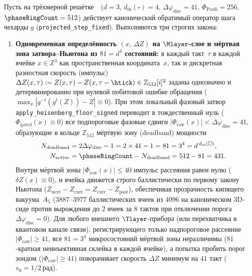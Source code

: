 \begin{theorem}[Строго локальный пороговый затвор--Ньютона $81 = d^4$, локальное зеркало Паули $Z_{\mathrm{next}} = -Z_{\mathrm{past}}$ и задержки светового конуса]
\label{thm:compute-local-heisenberg-pauli-gates}
Пусть на трёхмерной решётке~\latGCKshort\ ($d=3$, $d_{\mathrm{in}}(\square)=4$, $\Delta\varphi_{\mathrm{disc}}=41$, $\Phi_{\mathrm{Pauli}}=256$, $\phaseRingCount=512$) действует канонический обратимый оператор шага чехарды $g$ (\texttt{projected\_step\_fixed}). Выполняются три строгих закона:
\begin{enumerate}[leftmargin=*]
\item \textbf{Одновременная определённость $(x,\,\Delta Z)$ на $\Mlayer$-слое и мёртвая зона затвора--Ньютона из $81 = d^4$ состояний:}
  в каждый такт~$\tau$ в каждой ячейке $x\in\mathbb{Z}^3$ как пространственная координата~$x$, так и дискретная разностная скорость (импульс) $\Delta Z(x,\tau) := Z(x,\tau) - Z(x,\tau-\htick) \in \mathbb{Z}_{512}[i]^2$ заданы однозначно и детерминированно при нулевой побитовой ошибке обращения ($\max_x |g^{-t}(g^t(Z)) - Z| \equiv 0$).
  При этом локальный фазовый затвор \texttt{apply\_heisenberg\_floor\_signed} переводит в тождественный нуль ($\Phi_{\mathrm{gated}}(x) \equiv 0$) все подпороговые фазовые сдвиги $|\Phi_{\mathrm{raw}}(x)| < \Delta\varphi_{\mathrm{disc}} = 41$, образующие в кольце $\mathbb{Z}_{512}$ мёртвую зону (deadband) мощности
  \begin{equation}
  \label{eq:compute-heisenberg-deadband-81}
  \begin{aligned}
    N_{\mathrm{deadband}} &= 2\Delta\varphi_{\mathrm{disc}} - 1 = 2\times 41 - 1 = 81 = 3^4 = d^{\,d_{\mathrm{in}}(\square)},\\
    N_{\mathrm{active}} &= \phaseRingCount - N_{\mathrm{deadband}} = 512 - 81 = 431.
  \end{aligned}
  \end{equation}
  Внутри мёртвой зоны $|\Phi_{\mathrm{raw}}(x)| \le 40$ импульс рассеяния равен нулю ($\delta Z(x) \equiv 0$), и ячейка движется строго баллистически по первому закону Ньютона ($Z_{\mathrm{next}} - Z_{\mathrm{curr}} = Z_{\mathrm{curr}} - Z_{\mathrm{past}}$), обеспечивая прозрачность кипящего вакуума~$A_5$ ($3887\text{--}3977$ баллистических ячеек из $4096$ на каноническом 3D-сиде против вырождения до $2$ ячеек за $8$ тактов при отключении порога $\Delta\varphi_{\mathrm{disc}}=0$).
  Для любого внешнего $\Tlayer$-прибора (или перехватчика в квантовом канале связи), регистрирующего только надпороговое рассеяние $|\Phi_{\mathrm{raw}}| \ge 41$, все $81 = 3^4$ микросостояний мёртвой зоны неразличимы ($81$-кратная неинъективная склейка в каждой ячейке), а попытка пробить порог зондом ($|\Phi_{\mathrm{raw}}| \ge 41$) поворачивает скорость $\Delta Z$ минимум на $41$ такт ($s_0 = 1/2\ \text{рад}$).

\end{enumerate}
\end{theorem}
